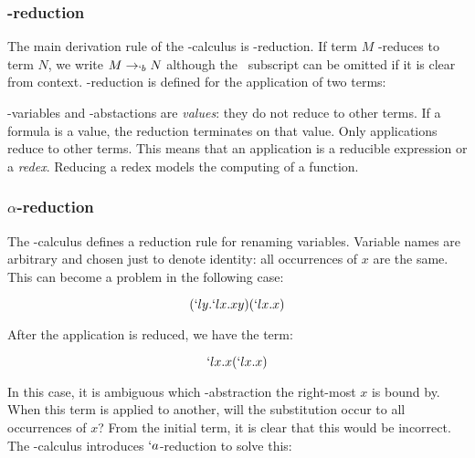 \subsubsection{\bta-reduction}
  The main derivation rule of the \lam-calculus is \bta-reduction. If term
  $M$ \bta-reduces to term $N$, we write $M \rightarrow_{`b} N$ although 
  the \bta\ subscript can be omitted if it is clear from context. \bta-reduction
  is defined for the application of two terms:
  \begin{figure}[!h]\label{def:beta-reduction}
  \end{figure}
 
  \lam-variables and \lam-abstactions are \emph{values}: they do not reduce
  to other terms. If a formula is a value, the reduction terminates on that 
  value. Only applications reduce to other terms. This means that an 
  application is a reducible expression or a \emph{redex}. Reducing a 
  redex models the computing of a function. 

\subsubsection{$\alpha$-reduction}
  
  The \lam-calculus defines a reduction rule for renaming variables.
  Variable names are arbitrary and chosen just to denote identity:
  all occurrences of $x$ are the same. This can become a problem
  in the following case:
  
  \[
    (`ly.`lx.xy)(`lx.x)
  \]
 
  After the application is reduced, we have the term:
  
  \[
    `lx.x(`lx.x) 
  \]
  
  In this case, it is ambiguous which \lam-abstraction the right-most $x$
  is bound by. When this term is applied to another, will the substitution
  occur to all occurrences of $x$? From the initial term, it is clear that
  this would be incorrect. The \lam-calculus introduces $`a$-reduction to
  solve this:
  
  \begin{figure}[!h]\label{def:alpha-reduction}
  \end{figure}
 
